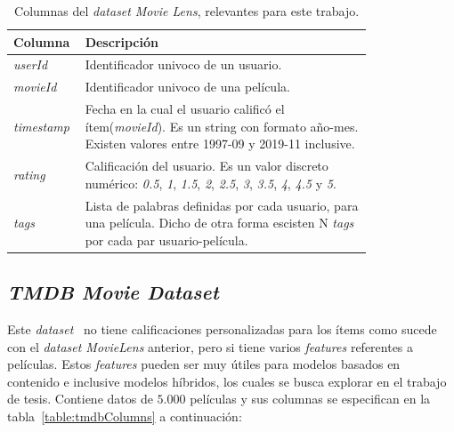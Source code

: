 \documentclass[11pt,a4paper,twoside]{thesis}
\begin{document}
\begin{table}[!htb]
	\centering
	\footnotesize
	\begin{tabular}{l | p{0.8\linewidth}}
		\hline
		Columna            & Descripción                                                                                                                                                                                 \\
		\hline
		\textit{userId}    & Identificador univoco de un usuario.                                                                                                                                                        \\
		\textit{movieId}   & Identificador univoco de una película.                                                                                                                                                      \\
		\textit{timestamp} & Fecha en la cual el usuario calificó el ítem(\textit{movieId}). Es un string con formato año-mes. Existen valores entre 1997-09 y 2019-11 inclusive.                                        \\
		\textit{rating}    & Calificación del usuario. Es un valor discreto numérico: \textit{0.5}, \textit{1}, \textit{1.5}, \textit{2}, \textit{2.5}, \textit{3}, \textit{3.5}, \textit{4}, \textit{4.5} y \textit{5}. \\
		\textit{tags}      & Lista de palabras definidas por cada usuario, para una película. Dicho de otra forma escisten N \textit{tags} por cada par usuario-película.                                                \\
		\hline
	\end{tabular}
	\caption{
		Columnas del \textit{dataset} \textit{Movie Lens}, relevantes para este trabajo.
	}
	\label{table:movieLensColumns}
\end{table}

\clearpage

\subsection{\textit{TMDB Movie Dataset}}

Este \textit{dataset}~\cite{tmdb} no tiene calificaciones personalizadas para
los ítems como sucede con el \textit{dataset MovieLens} anterior, pero si tiene
varios \textit{features} referentes a películas. Estos \textit{features} pueden
ser muy útiles para modelos basados en contenido e inclusive modelos híbridos,
los cuales se busca explorar en el trabajo de tesis. Contiene datos de $5.000$
películas y sus columnas se especifican en la tabla~\ref{table:tmdbColumns} a
continuación:
\end{document}
